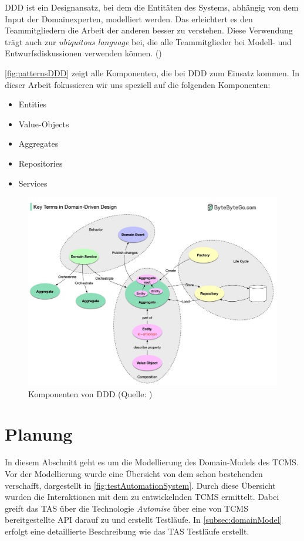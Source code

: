 \documentclass[a4paper, fontsize=11pt, parskip=half, twoside]{scrreprt}
\begin{document}
	\ac{DDD} ist ein Designansatz, bei dem die Entitäten des Systems, abhängig von dem Input der Domainexperten, modelliert werden.
	Das erleichtert es den Teammitgliedern die Arbeit der anderen besser zu verstehen.
	Diese Verwendung trägt auch zur \emph{ubiquitous language} bei, die alle Teammitglieder bei Modell- und Entwurfsdiskussionen verwenden können. (\textcite{vernon_implementing_2013})
	
	\autoref{fig:patternsDDD} zeigt alle Komponenten, die bei \ac{DDD} zum Einsatz kommen. 
	In dieser Arbeit fokussieren wir uns speziell auf die folgenden Komponenten:
	
	\begin{itemize}
		\setlength\itemsep{-0.5em}
		\item Entities 
		\item Value-Objects
		\item Aggregates
		\item Repositories
		\item Services
	\end{itemize}
	
	\begin{figure}[ht]
		\centering
		\includegraphics[scale=0.32]{assets/componentsDDD.jpg}
		\caption{Komponenten von \ac{DDD} (Quelle: \textcite{xu_ep32_2023})}
		\label{fig:patternsDDD}
	\end{figure}

	
	\section{Planung}
	In diesem Abschnitt geht es um die Modellierung des Domain-Models des \ac{TCMS}.
	Vor der Modellierung wurde eine Übersicht von dem schon bestehenden  verschafft, dargestellt in \autoref{fig:testAutomationSystem}.
	Durch diese Übersicht wurden die Interaktionen mit dem zu entwickelnden \ac{TCMS} ermittelt.
	Dabei greift das \ac{TAS} über die Technologie \emph{Automise} über eine von \ac{TCMS} bereitgestellte \ac{API} darauf zu und erstellt Testläufe.
	In \autoref{subsec:domainModel} erfolgt eine detaillierte Beschreibung wie das \ac{TAS} Testläufe erstellt.
	
\end{document}
